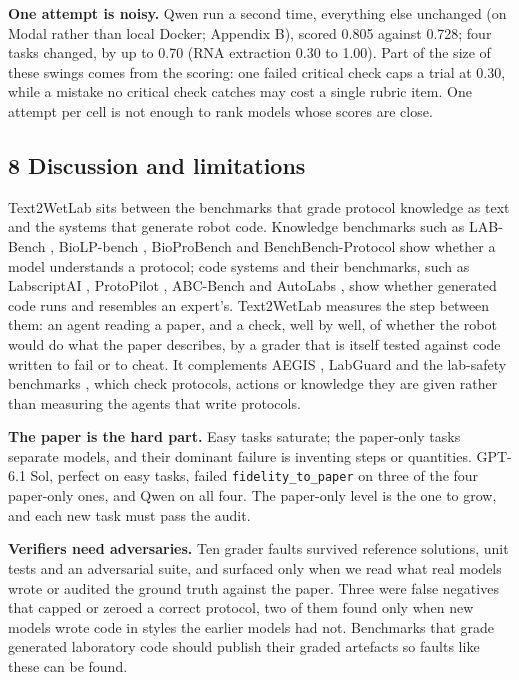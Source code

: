 \documentclass[
]{article}
\begin{document}
\textbf{One attempt is noisy.} Qwen run a second time, everything else
unchanged (on Modal rather than local Docker; Appendix B), scored 0.805
against 0.728; four tasks changed, by up to 0.70 (RNA extraction 0.30 to
1.00). Part of the size of these swings comes from the scoring: one
failed critical check caps a trial at 0.30, while a mistake no critical
check catches may cost a single rubric item. One attempt per cell is not
enough to rank models whose scores are close.

\subsection{8 Discussion and
limitations}\label{discussion-and-limitations}

Text2WetLab sits between the benchmarks that grade protocol knowledge as
text and the systems that generate robot code. Knowledge benchmarks such
as LAB-Bench \citep{laurent2024labbench}, BioLP-bench
\citep{ivanov2024biolpbench}, BioProBench \citep{liu2025bioprobench} and
BenchBench-Protocol \citep{sivakumar2026benchbench} show whether a model
understands a protocol; code systems and their benchmarks, such as
LabscriptAI \citep{gao2025labscriptai}, ProtoPilot
\citep{jiang2026protopilot}, ABC-Bench \citep{liu2026abcbench} and
AutoLabs \citep{panapitiya2026autolabs}, show whether generated code
runs and resembles an expert's. Text2WetLab measures the step between
them: an agent reading a paper, and a check, well by well, of whether
the robot would do what the paper describes, by a grader that is itself
tested against code written to fail or to cheat. It complements AEGIS
\citep{setty2026aegis}, LabGuard \citep{yang2026labguard} and the
lab-safety benchmarks \citep{zhou2026labsafety, sun2026labshield}, which
check protocols, actions or knowledge they are given rather than
measuring the agents that write protocols.

\textbf{The paper is the hard part.} Easy tasks saturate; the paper-only
tasks separate models, and their dominant failure is inventing steps or
quantities. GPT-6.1 Sol, perfect on easy tasks, failed
\texttt{fidelity\_to\_paper} on three of the four paper-only ones, and
Qwen on all four. The paper-only level is the one to grow, and each new
task must pass the audit.

\textbf{Verifiers need adversaries.} Ten grader faults survived
reference solutions, unit tests and an adversarial suite, and surfaced
only when we read what real models wrote or audited the ground truth
against the paper. Three were false negatives that capped or zeroed a
correct protocol, two of them found only when new models wrote code in
styles the earlier models had not. Benchmarks that grade generated
laboratory code should publish their graded artefacts so faults like
these can be found.
\end{document}
